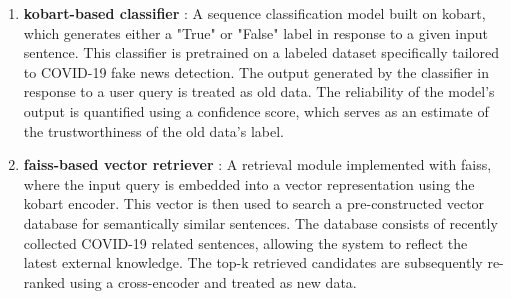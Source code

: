 \documentclass[a4paper,fleqn]{cas-sc}
\begin{document}
\begin{enumerate}
    \item\textbf{\gls{kobart}-based classifier} :
    A sequence classification model built on \gls{kobart}, which generates either a "True" or "False" label in response to a given input sentence. This classifier is pretrained on a labeled dataset specifically tailored to COVID-19 fake news detection. The output generated by the classifier in response to a user query is treated as old data. The reliability of the model's output is quantified using a confidence score, which serves as an estimate of the trustworthiness of the old data's label.
    \item\textbf{\gls{faiss}-based vector retriever} : 
    A retrieval module implemented with \gls{faiss}, where the input query is embedded into a vector representation using the \gls{kobart} encoder. This vector is then used to search a pre-constructed vector database for semantically similar sentences. The database consists of recently collected COVID-19 related sentences, allowing the system to reflect the latest external knowledge. The top-k retrieved candidates are subsequently re-ranked using a cross-encoder and treated as new data.


\end{enumerate}
\end{document}
